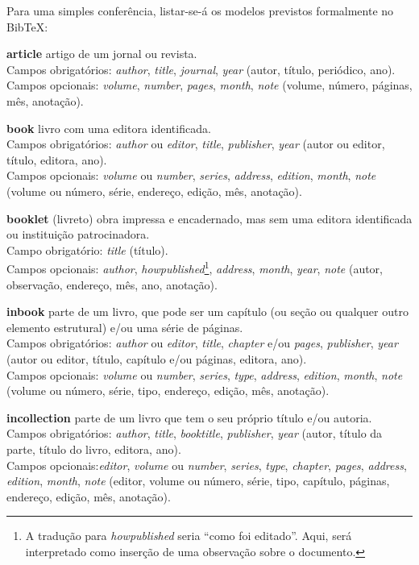 \documentclass[a4paper,12pt,oneside,onecolumn,final,fleqn]{repUERJ}
\begin{document}
Para uma simples conferência, listar-se-á os modelos previstos formalmente no \textsf{BibTeX}:
\begin{alinea}
\item [\textbf{article}] artigo de um jornal ou revista.\\
Campos obrigatórios: \textit{author}, \textit{title}, \textit{journal}, \textit{year} (autor, título, periódico, ano).\\
Campos opcionais: \textit{volume}, \textit{number}, \textit{pages}, \textit{month}, \textit{note} (volume, número, páginas, mês, anotação).

\item [\textbf{book}] livro com uma editora identificada.\\
Campos obrigatórios: \textit{author} ou \textit{editor}, \textit{title}, \textit{publisher}, \textit{year} (autor ou editor, título, editora, ano).\\
Campos opcionais: \textit{volume} ou \textit{number}, \textit{series}, \textit{address}, \textit{edition}, \textit{month}, \textit{note} (volume ou número, série, endereço, edição, mês, anotação).

\item [\textbf{booklet}] (livreto) obra impressa e encadernado, mas sem uma editora identificada ou instituição patrocinadora.\\
Campo obrigatório: \textit{title} (título).\\
Campos opcionais: \textit{author}, \textit{howpublished}\footnote{A tradução para \textit{howpublished} seria ``como foi editado''. Aqui, será interpretado como inserção de uma observação sobre o documento.}, \textit{address}, \textit{month}, \textit{year}, \textit{note} (autor, observação, endereço, mês, ano, anotação).

\item [\textbf{inbook}] parte de um livro, que pode ser um capítulo (ou seção ou qualquer outro elemento estrutural) e/ou uma série de páginas.\\
Campos obrigatórios: \textit{author} ou \textit{editor}, \textit{title}, \textit{chapter} e/ou \textit{pages}, \textit{publisher}, \textit{year} (autor ou editor, título, capítulo e/ou páginas, editora, ano).\\
Campos opcionais: \textit{volume} ou \textit{number}, \textit{series}, \textit{type}, \textit{address}, \textit{edition}, \textit{month}, \textit{note} (volume ou número, série, tipo, endereço, edição, mês, anotação).

\item [\textbf{incollection}] parte de um livro que tem o seu próprio título e/ou autoria.\\
Campos obrigatórios: \textit{author}, \textit{title}, \textit{booktitle}, \textit{publisher}, \textit{year} (autor, título da parte, título do livro, editora, ano).\\
Campos opcionais:\textit{editor}, \textit{volume} ou \textit{number}, \textit{series}, \textit{type}, \textit{chapter}, \textit{pages}, \textit{address}, \textit{edition}, \textit{month}, \textit{note} (editor, volume ou número, série, tipo, capítulo, páginas, endereço, edição, mês, anotação).


\end{alinea}
\end{document}

